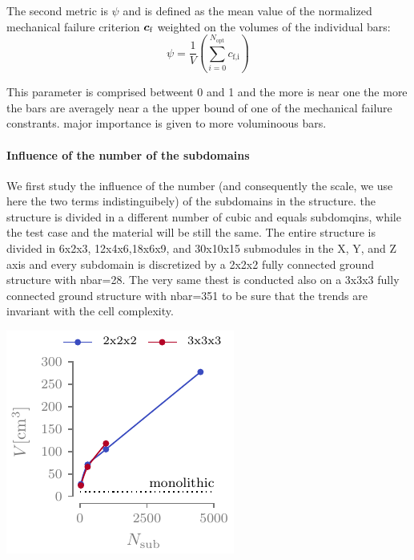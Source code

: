 The second metric is $\psi$ and is defined as the mean value of the normalized mechanical failure criterion $\bm{c}_\text{f}$ weighted on the volumes of the individual bars:
\begin{equation}
    \psi = \frac{1}{V} \left( \sum_{i=0}^{N_\text{opt}} c_\text{f,i} \right)
\end{equation}

This parameter is comprised betweent 0 and 1 and the more is near one the more the bars are averagely near a the upper bound of one of the mechanical failure constrants. major importance is given to more voluminoous bars.

\paragraph{Influence of the number of the subdomains}
We first study the influence of the number (and consequently the scale, we use here the two terms indistinguibely) of the subdomains in the structure. the structure is divided in a different number of cubic and equals subdomqins, while the test case and the material will be still the same. The entire structure is divided in 6x2x3, 12x4x6,18x6x9, and 30x10x15 submodules in the X, Y, and Z axis and every subdomain is discretized by a 2x2x2 fully connected ground structure with nbar=28. The very same thest is conducted also on a 3x3x3 fully connected ground structure with nbar=351 to be sure that the trends are invariant with the cell complexity.

\begin{marginfigure}
    \centering
    \includegraphics{figures/05_cellular_opt/00_module_scale_tab/scale_tab_v.pdf}
    \caption{}
    \label{fig:05_scale_v}
\end{marginfigure}

